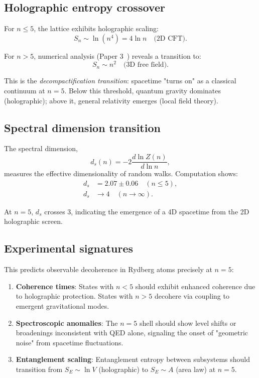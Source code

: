 \documentclass[aps,prd,twocolumn,superscriptaddress,groupedaddress,showpacs]{revtex4-2}
\begin{document}
\subsection{Holographic entropy crossover}

For $n \leq 5$, the lattice exhibits holographic scaling:
\begin{equation}
S_n \sim \ln(n^4) = 4 \ln n \quad \text{(2D CFT)}.
\end{equation}

For $n > 5$, numerical analysis (Paper 3~\cite{Louthan_III}) reveals a transition to:
\begin{equation}
S_n \sim n^{2} \quad \text{(3D free field)}.
\end{equation}

This is the \emph{decompactification transition}: spacetime "turns on" as a classical continuum at $n=5$. Below this threshold, quantum gravity dominates (holographic); above it, general relativity emerges (local field theory).

\subsection{Spectral dimension transition}

The spectral dimension,
\begin{equation}
d_s(n) = -2 \frac{d \ln Z(n)}{d \ln n},
\end{equation}
measures the effective dimensionality of random walks. Computation shows:
\begin{align}
d_s &= 2.07 \pm 0.06 \quad (n \leq 5), \\
d_s &\to 4 \quad (n \to \infty).
\end{align}

At $n=5$, $d_s$ crosses 3, indicating the emergence of a 4D spacetime from the 2D holographic screen.

\subsection{Experimental signatures}

This predicts observable decoherence in Rydberg atoms precisely at $n=5$:
\begin{enumerate}
\item \textbf{Coherence times}: States with $n < 5$ should exhibit enhanced coherence due to holographic protection. States with $n > 5$ decohere via coupling to emergent gravitational modes.

\item \textbf{Spectroscopic anomalies}: The $n=5$ shell should show level shifts or broadenings inconsistent with QED alone, signaling the onset of "geometric noise" from spacetime fluctuations.

\item \textbf{Entanglement scaling}: Entanglement entropy between subsystems should transition from $S_E \sim \ln V$ (holographic) to $S_E \sim A$ (area law) at $n=5$.
\end{enumerate}
\end{document}
